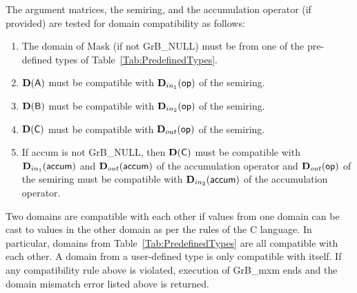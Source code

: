The argument matrices, the semiring, and the accumulation operator (if provided) 
are tested for domain compatibility as follows:
\begin{enumerate}
	\item The domain of {\sf Mask} (if not {\sf GrB\_NULL}) must be from one of the pre-defined types of Table~\ref{Tab:PredefinedTypes}.

	\item $\bold{D}({\sf A})$ must be compatible with $\mbox{$\mathbf{D}_{in_{1}}$}({\sf op})$ of the semiring.

	\item $\bold{D}({\sf B})$ must be compatible with $\mbox{$\mathbf{D}_{in_{2}}$}({\sf op})$ of the semiring.

	\item $\bold{D}({\sf C})$ must be compatible with $\mbox{$\mathbf{D}_{out}$}({\sf op})$ of the semiring.

	\item If {\sf accum} is not {\sf GrB\_NULL}, then $\bold{D}({\sf C})$ must be
    compatible with $\mbox{$\mathbf{D}_{in_{1}}$}({\sf accum})$ and $\mbox{$\mathbf{D}_{out}$}({\sf accum})$ of the 
    accumulation operator and $\mbox{$\mathbf{D}_{out}$}({\sf op})$ of the semiring must be compatible with 
    $\mbox{$\mathbf{D}_{in_{2}}$}({\sf accum})$ of the accumulation operator.
\end{enumerate}
Two domains are compatible with each other if values from one domain can be cast 
to values in the other domain as per the rules of the C language.
In particular, domains from Table~\ref{Tab:PredefinedTypes} are all compatible 
with each other. A domain from a user-defined type is only compatible with itself.
If any compatibility rule above is violated, execution of {\sf GrB\_mxm} ends and 
the domain mismatch error listed above is returned.

